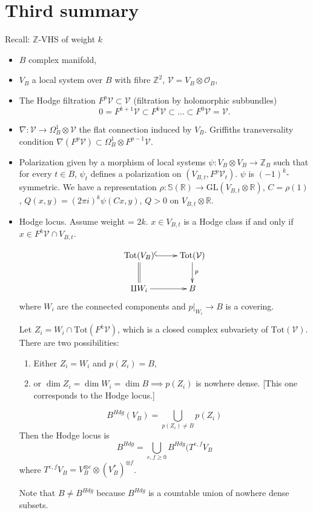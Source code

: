 
\section{Third summary}
\label{section-summary-duplicate-2}

\noindent
Recall: $\mathbb{Z}$-VHS of weight $k$
\begin{itemize}
\item $B$ complex manifold,

\item $V_B$ a local system over $B$ with
fibre $\mathbb{Z}^2$,
$\mathcal{V}=V_B \otimes \mathcal{O}_B$,

\item The Hodge filtration $F^p\mathcal{V}
\subset \mathcal{V}$
(filtration by holomorphic subbundles)
$$
0=F^{k+1}\mathcal{V} \subset F^k\mathcal{V}
\subset…\subset F^0\mathcal{V}=\mathcal{V}.
$$

\item $\nabla:\mathcal{V} \to \Omega^1_B
\otimes \mathcal{V}$
the flat connection induced by $V_B$.
Griffiths transversality condition
$\nabla(F^p\mathcal{V})
\subset\Omega_B^1\otimes
F^{p-1}\mathcal{V}$.

\item Polarization given by a morphism of
local systems
$\psi:V_B \otimes V_B \to \mathbb{Z}_B$
such that for every $t \in B$, $\psi_t$
defines a polarization
on $(V_{B,t},F^p\mathcal{V}_t)$.
$\psi$ is $(-1)^k$-symmetric.
We have a representation
$\rho:\mathbb{S}(\mathbb{R}) \to
\text{GL}(V_{B,t}\otimes \mathbb{R})$,
$C=\rho(1)$,
$Q(x,y)=(2\pi i)^k \psi(Cx,y)$,
$Q>0$ on  $V_{B,t} \otimes \mathbb{R}$.

\item Hodge locus.
Assume weight = $2k$.
$x \in V_{B,t}$ is a Hodge class if and only
if
$x \in F^k\mathcal{V} \cap V_{B,t}$.

 $$
\xymatrix{
\text{Tot}(V_B)\ar@{^{(}->}[r]\ar@{=}[d]
&\text{Tot}(\mathcal{V})\ar[d]^{p}\\
\amalg W_i\ar[r]
&B
}
$$
where $W_i$ are the connected components and
$p|_{W_i}\to B$ is a covering.

Let $Z_i=W_i\cap \text{Tot}(F^k\mathcal{V})$,
which is a closed complex subvariety of
$\text{Tot}(\mathcal{V})$.
There are two possibilities:
\begin{enumerate}
\item Either $Z_i=W_i$ and $p(Z_i)=B$,
\item or $\dim Z_i=\dim W_i= \dim B \implies
p(Z_i)$
is nowhere dense. [This one corresponds to
the Hodge locus.]
\end{enumerate}

\noindent
$$
B^{Hdg}(V_B)
=\bigcup_{p(Z_i)\neq B}p(Z_i)
$$
Then the Hodge locus is
$$
B^{Hdg}=\bigcup_{e,f \geq
0}B^{Hdg}(T^{e,f}V_B
$$
where $T^{e,f}V_B=V_B^{\otimes e}\otimes
(V_B^* )^{\otimes f}$.

Note that $B \neq  B^{Hdg}$
because $B^{Hdg}$ is a countable union of
nowhere dense subsets.

\end{itemize}

